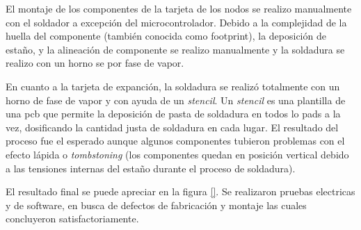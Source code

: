 El montaje de los componentes de la tarjeta de los nodos se realizo manualmente con el soldador a excepción del microcontrolador. Debido a la  complejidad de la huella del componente (también conocida como footprint), la deposición de estaño, y la alineación de componente se realizo manualmente y la soldadura se realizo con un horno se por fase de vapor.


En cuanto a la tarjeta de expanción, la soldadura se realizó totalmente con un horno de fase de vapor y con ayuda de un \textit{stencil}. Un \textit{stencil} es una plantilla de una pcb que permite la deposición de pasta de soldadura en todos lo pads a la vez, dosificando la cantidad justa de soldadura en cada lugar.  El resultado del proceso fue el esperado aunque algunos componentes tubieron problemas con el efecto lápida o \textit{tombstoning} (los componentes quedan en posición vertical debido a las tensiones internas del estaño durante el proceso de soldadura).


El resultado final se puede apreciar en la figura \ref{}. Se realizaron pruebas electricas y de software, en busca de defectos de fabricación y montaje las cuales concluyeron satisfactoriamente. 


